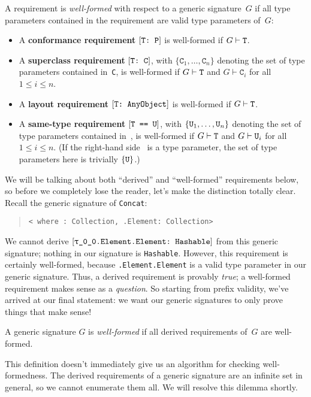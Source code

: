 \documentclass[../generics]{subfiles}
\begin{document}
\begin{definition}\label{valid requirement}
A requirement is \emph{well-formed} with respect to a generic signature~$G$ if all type parameters contained in the requirement are valid type parameters of~$G$:
\begin{itemize}
\item A \textbf{conformance requirement} $[\texttt{T:~P}]$ is well-formed if $G\vdash\texttt{T}$.
\item A \textbf{superclass requirement} $[\texttt{T:~C}]$, with $\{\texttt{C}_1,\ldots,\texttt{C}_n\}$ denoting the set of type parameters contained in~\texttt{C}, is well-formed if $G\vdash\texttt{T}$ and $G\vdash\texttt{C}_i$ for all $1\le i\le n$.
\item A \textbf{layout requirement} $[\texttt{T:~AnyObject}]$ is well-formed if $G\vdash\texttt{T}$.
\item A \textbf{same-type requirement} $[\texttt{T == U}]$, with $\{\texttt{U}_1,\ldots,\texttt{U}_n\}$ denoting the set of type parameters contained in~\tU, is well-formed if $G\vdash\texttt{T}$ and $G\vdash\texttt{U}_i$ for all $1\le i\le n$. (If the right-hand side \tU\ is a type parameter, the set of type parameters here is trivially $\{\texttt{U}\}$.)
\end{itemize}
\end{definition}

We will be talking about both ``derived'' and ``well-formed'' requirements below, so before we completely lose the reader, let's make the distinction totally clear. Recall the generic signature of \texttt{Concat}:
\begin{quote}
\texttt{<\rT~where \rT:~Collection, \rT.Element:~Collection>}
\end{quote}
We cannot derive $\ConfReq{\rT.Element.Element}{Hashable}$ from this generic signature; nothing in our signature is \texttt{Hashable}. However, this requirement is certainly well-formed, because \texttt{\rT.Element.Element} is a valid type parameter in our generic signature. Thus, a derived requirement is provably \emph{true}; a well-formed requirement makes sense as a \emph{question}. So starting from prefix validity, we've arrived at our final statement: we want our generic signatures to only prove things that make sense!

\begin{definition}\label{valid generic signature def}
A generic signature $G$ is \emph{well-formed} if all derived requirements of~$G$ are well-formed.
\end{definition}
This definition doesn't immediately give us an algorithm for checking well-formedness. The derived requirements of a generic signature are an infinite set in general, so we cannot enumerate them all. We will resolve this dilemma shortly.
\end{document}
